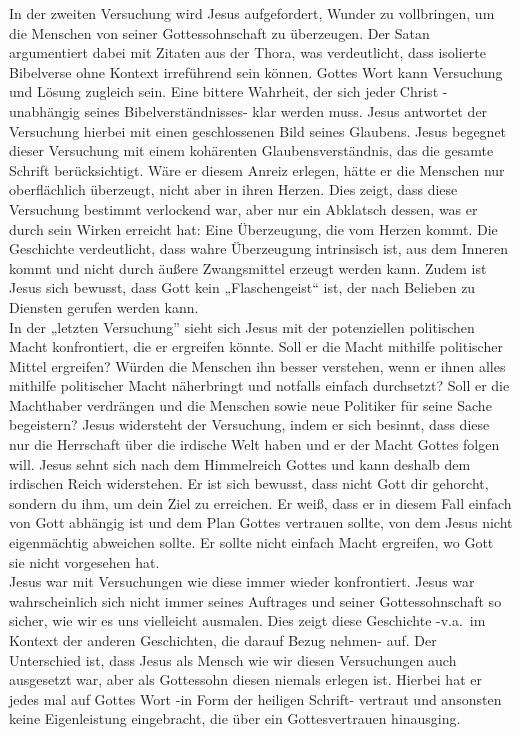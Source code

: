 In der zweiten Versuchung wird Jesus aufgefordert, Wunder zu vollbringen, um die Menschen von seiner Gottessohnschaft zu überzeugen. Der Satan argumentiert dabei mit Zitaten aus der Thora, was verdeutlicht, dass isolierte Bibelverse ohne Kontext irreführend sein können. Gottes Wort kann Versuchung und Lösung zugleich sein. Eine bittere Wahrheit, der sich jeder Christ -unabhängig seines Bibelverständnisses- klar werden muss. Jesus antwortet der Versuchung hierbei mit einen geschlossenen Bild seines Glaubens. Jesus begegnet dieser Versuchung mit einem kohärenten Glaubensverständnis, das die gesamte Schrift berücksichtigt. Wäre er diesem Anreiz erlegen, hätte er die Menschen nur oberflächlich überzeugt, nicht aber in ihren Herzen. Dies zeigt, dass diese Versuchung bestimmt verlockend war, aber nur ein Abklatsch dessen, was er durch sein Wirken erreicht hat: Eine Überzeugung, die vom Herzen kommt. Die Geschichte verdeutlicht, dass wahre Überzeugung intrinsisch ist, aus dem Inneren kommt und nicht durch äußere Zwangsmittel erzeugt werden kann. Zudem ist Jesus sich bewusst, dass Gott kein „Flaschengeist“ ist, der nach Belieben zu Diensten gerufen werden kann.\\

In der „letzten Versuchung” sieht sich Jesus mit der potenziellen politischen Macht konfrontiert, die er ergreifen könnte.
Soll er die Macht mithilfe politischer Mittel ergreifen? Würden die Menschen ihn besser verstehen, wenn er ihnen alles mithilfe politischer Macht näherbringt und notfalls einfach durchsetzt? Soll er die Machthaber verdrängen und die Menschen sowie neue Politiker für seine Sache begeistern? Jesus widersteht der Versuchung, indem er sich besinnt, dass diese nur die Herrschaft über die irdische Welt haben und er der Macht Gottes folgen will. Jesus sehnt sich nach dem Himmelreich Gottes und kann deshalb dem irdischen Reich widerstehen. Er ist sich bewusst, dass nicht Gott dir gehorcht, sondern du ihm, um dein Ziel zu erreichen. Er weiß, dass er in diesem Fall einfach von Gott abhängig ist und dem Plan Gottes vertrauen sollte, von dem Jesus nicht eigenmächtig abweichen sollte. Er sollte nicht einfach Macht ergreifen, wo Gott sie nicht vorgesehen hat.\\

Jesus war mit Versuchungen wie diese immer wieder konfrontiert. Jesus war wahrscheinlich sich nicht immer seines
Auftrages und seiner Gottessohnschaft so sicher, wie wir es uns vielleicht ausmalen. Dies zeigt diese Geschichte -v.a.\
im Kontext der anderen Geschichten, die darauf Bezug nehmen- auf. Der Unterschied ist, dass Jesus als Mensch wie wir
diesen Versuchungen auch ausgesetzt war, aber als Gottessohn diesen niemals erlegen ist. Hierbei hat er jedes mal auf
Gottes Wort -in Form der heiligen Schrift- vertraut und ansonsten keine Eigenleistung eingebracht, die über ein
Gottesvertrauen hinausging.

